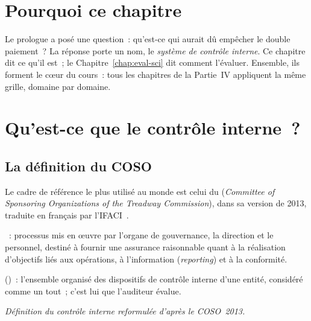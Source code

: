 \bigskip

\section*{Pourquoi ce chapitre}

Le prologue a posé une question~: qu'est-ce qui aurait dû empêcher le
double paiement~? La réponse porte un nom, le \emph{système de contrôle
interne}. Ce chapitre dit ce qu'il est~; le Chapitre~\ref{chap:eval-sci}
dit comment l'évaluer. Ensemble, ils forment le cœur du cours~: tous les
chapitres de la Partie~IV appliquent la même grille, domaine par domaine.

\separateur

\section{Qu'est-ce que le contrôle interne~?}
\label{sec:c02-definition}

\subsection{La définition du COSO}

Le cadre de référence le plus utilisé au monde est celui du 
(\textit{Committee of Sponsoring Organizations of the Treadway
Commission}), dans sa version de 2013, traduite en français par
l'IFACI~\cite{coso2013ic,coso2013icfr}.

\begin{boxdef}
~: processus mis en
œuvre par l'organe de gouvernance, la direction et le personnel, destiné à
fournir une assurance raisonnable quant à la réalisation d'objectifs liés
aux opérations, à l'information (\textit{reporting}) et à la conformité.

\medskip
{}
()~: l'ensemble organisé des dispositifs de contrôle interne
d'une entité, considéré comme un tout~; c'est lui que l'auditeur évalue.
\end{boxdef}
{\small\itshape Définition du contrôle interne reformulée d'après le
COSO~2013.}

